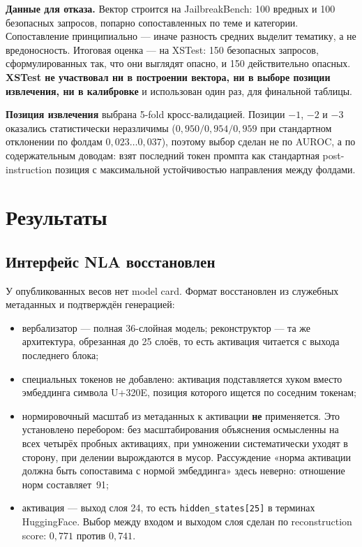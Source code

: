 \documentclass[11pt,a4paper]{article}
\begin{document}
\textbf{Данные для отказа.} Вектор строится на JailbreakBench: 100 вредных и 100
безопасных запросов, попарно сопоставленных по теме и категории. Сопоставление
принципиально --- иначе разность средних выделит тематику, а не вредоносность.
Итоговая оценка --- на XSTest: 150 безопасных запросов, сформулированных так,
что они выглядят опасно, и 150 действительно опасных. \textbf{XSTest не
участвовал ни в построении вектора, ни в выборе позиции извлечения, ни в
калибровке} и использован один раз, для финальной таблицы.

\textbf{Позиция извлечения} выбрана 5-fold кросс-валидацией. Позиции $-1$, $-2$
и $-3$ оказались статистически неразличимы ($0{,}950/0{,}954/0{,}959$ при
стандартном отклонении по фолдам $0{,}023\ldots0{,}037$), поэтому выбор сделан
не по AUROC, а по содержательным доводам: взят последний токен промпта как
стандартная post-instruction позиция с максимальной устойчивостью направления
между фолдами.

\section{Результаты}

\subsection{Интерфейс NLA восстановлен}
\label{sec:iface}

У опубликованных весов нет model card. Формат восстановлен из служебных
метаданных и подтверждён генерацией:

\begin{itemize}
\item вербализатор --- полная 36-слойная модель; реконструктор --- та же
      архитектура, обрезанная до 25 слоёв, то есть активация читается с выхода
      последнего блока;
\item специальных токенов не добавлено: активация подставляется хуком вместо
      эмбеддинга символа U+320E, позиция которого ищется по соседним токенам;
\item нормировочный масштаб из метаданных к активации \textbf{не} применяется.
      Это установлено перебором: без масштабирования объяснения осмысленны на
      всех четырёх пробных активациях, при умножении систематически уходят в
      сторону, при делении вырождаются в мусор. Рассуждение «норма активации
      должна быть сопоставима с нормой эмбеддинга» здесь неверно: отношение норм
      составляет~91;
\item активация --- выход слоя 24, то есть \texttt{hidden\_states[25]} в
      терминах HuggingFace. Выбор между входом и выходом слоя сделан по
      reconstruction score: $0{,}771$ против $0{,}741$.
\end{itemize}
\end{document}
